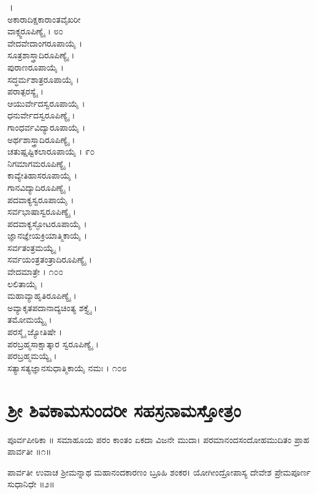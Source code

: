 \begin{multicols}{2}
।\\ಅಕಾರಾದಿಕ್ಷಕಾರಾಂತವೈಖರೀ\\ವಾಕ್ಸ್ವರೂಪಿಣ್ಯೈ । ೮೦\\ವೇದವೇದಾಂಗರೂಪಾಯೈ ।\\ಸೂತ್ರಶಾಸ್ತ್ರಾದಿರೂಪಿಣ್ಯೈ ।\\ಪುರಾಣರೂಪಾಯೈ ।\\ಸದ್ಧರ್ಮಶಾತ್ರರೂಪಾಯೈ ।\\ಪರಾತ್ಪರಸ್ಯೈ ।\\ಆಯುರ್ವೇದಸ್ವರೂಪಾಯೈ ।\\ಧನುರ್ವೇದಸ್ವರೂಪಿಣ್ಯೈ ।\\ಗಾಂಧರ್ವವಿದ್ಯಾರೂಪಾಯೈ ।\\ಅರ್ಥಶಾಸ್ತ್ರಾದಿರೂಪಿಣ್ಯೈ ।\\ಚತುಷ್ಷಷ್ಟಿಕಲಾರೂಪಾಯೈ । ೯೦\\ನಿಗಮಾಗಮರೂಪಿಣ್ಯೈ ।\\ಕಾವ್ಯೇತಿಹಾಸರೂಪಾಯೈ ।\\ಗಾನವಿದ್ಯಾದಿರೂಪಿಣ್ಯೈ ।\\ಪದವಾಕ್ಯಸ್ವರೂಪಾಯೈ ।\\ಸರ್ವಭಾಷಾಸ್ವರೂಪಿಣ್ಯೈ ।\\ಪದವಾಕ್ಯಸ್ಫೋಟರೂಪಾಯೈ ।\\ಜ್ಞಾನಜ್ಞೇಯಕ್ರಿಯಾತ್ಮಿಕಾಯೈ ।\\ಸರ್ವತಂತ್ರಮಯ್ಯೈ ।\\ಸರ್ವಯಂತ್ರತಂತ್ರಾದಿರೂಪಿಣ್ಯೈ ।\\ವೇದಮಾತ್ರೇ । ೧೦೦\\ಲಲಿತಾಯೈ ।\\ಮಹಾವ್ಯಾಹೃತಿರೂಪಿಣ್ಯೈ ।\\ಅವ್ಯಾಕೃತಪದಾನಾದ್ಯಚಿಂತ್ಯ ಶಕ್ತ್ಯೈ ।\\ತಮೋಮಯ್ಯೈ ।\\ಪರಸ್ಮೈ ಜ್ಯೋತಿಷೇ ।\\ಪರಬ್ರಹ್ಮಸಾಕ್ಷಾತ್ಕಾರ  ಸ್ವರೂಪಿಣ್ಯೈ ।\\ಪರಬ್ರಹ್ಮಮಯ್ಯೈ ।\\ಸತ್ಯಾಸತ್ಯಜ್ಞಾನಸುಧಾತ್ಮಿಕಾಯೈ ನಮಃ । ೧೦೮\\\end{multicols}
\section{ ಶ್ರೀ ಶಿವಕಾಮಸುಂದರೀ ಸಹಸ್ರನಾಮಸ್ತೋತ್ರಂ }
ಪೂರ್ವಪೀಠಿಕಾ ॥
ಸಮಾಹೂಯ ಪರಂ ಕಾಂತಂ ಏಕದಾ ವಿಜನೇ ಮುದಾ।
ಪರಮಾನಂದಸಂದೋಹಮುದಿತಂ ಪ್ರಾಹ ಪಾರ್ವತೀ ॥೧॥

ಪಾರ್ವತೀ ಉವಾಚ
ಶ್ರೀಮನ್ನಾಥ ಮಹಾನಂದಕಾರಣಂ ಬ್ರೂಹಿ ಶಂಕರ।
ಯೋಗೀಂದ್ರೋಪಾಸ್ಯ ದೇವೇಶ ಪ್ರೇಮಪೂರ್ಣ ಸುಧಾನಿಧೇ ॥೨॥

